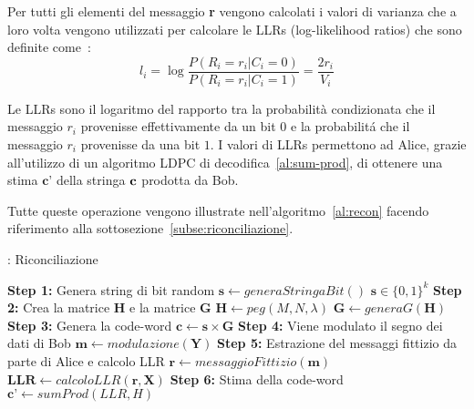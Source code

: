 Per tutti gli elementi del messaggio \textbf{r} vengono calcolati i valori di varianza che a loro volta vengono utilizzati per calcolare le LLRs (log-likelihood ratios) che sono definite come~\cite{gumucs2021novel}:
\begin{equation}
l_i = \log \frac{P(R_i = r_i| C_i = 0)}{P(R_i = r_i| C_i = 1)} = \frac{2r_i}{V_i}
\end{equation}

Le LLRs sono il logaritmo del rapporto tra la probabilit\`a condizionata che il messaggio $r_i$ provenisse effettivamente da un bit $0$ e la probabilit\'a che il messaggio $r_i$ provenisse da una bit $1$. I valori di LLRs permettono ad Alice, grazie all'utilizzo di un algoritmo LDPC di decodifica~\ref{al:sum-prod}, di ottenere una stima $\textbf{c'}$ della stringa $\textbf c$ prodotta da Bob.



Tutte queste operazione vengono illustrate nell'algoritmo~\ref{al:recon} facendo riferimento alla sottosezione~\ref{subse:riconciliazione}.

\begin{algorithm}[t]
\caption{: Riconciliazione}\label{al:recon}
\begin{algorithmic}[1]
\State \textbf{Step 1:} Genera string di bit random
	\State $\textbf{s} \leftarrow generaStringaBit()$	\Comment $\textbf{s} \in \{0,1\}^k$
\State \textbf{Step 2:} Crea la matrice $\textbf{H}$ e la matrice $\textbf{G}$
	\State $\textbf{H} \leftarrow peg(M,N, \lambda )$	 
	\State {}							
	\State $ \textbf{G} \leftarrow generaG(\textbf{H})$
\State \textbf{Step 3:} Genera la code-word
	\State $\textbf{c} \leftarrow \textbf{s} \times \textbf{G}$
\State \textbf{Step 4:} Viene modulato il segno dei dati di Bob
	\State $\textbf{m} \leftarrow modulazione(\textbf{Y})$
\State \textbf{Step 5:} Estrazione del messaggi fittizio da parte di Alice e calcolo LLR
	\State $\textbf{r} \leftarrow messaggioFittizio(\textbf{m})$
	\State $\textbf{LLR} \leftarrow calcoloLLR(\textbf{r}, \textbf{X})$
\State \textbf{Step 6:} Stima della code-word
	\State $\textbf{c'} \leftarrow sumProd(LLR, H)$
\end{algorithmic}
\end{algorithm}

